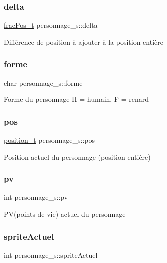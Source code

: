 \subsubsection{\texorpdfstring{delta}{delta}}
{\footnotesize\ttfamily \hyperlink{structfrac_pos__s}{frac\+Pos\+\_\+t} personnage\+\_\+s\+::delta}

Différence de position à ajouter à la position entière \mbox{\label{structpersonnage__s_a1f1eb200420640259201a84300bccf7e}} 
\subsubsection{\texorpdfstring{forme}{forme}}
{\footnotesize\ttfamily char personnage\+\_\+s\+::forme}

Forme du personnage H = humain, F = renard \mbox{\label{structpersonnage__s_adea4789f8b55587ec092f3a32b7b1964}} 
\subsubsection{\texorpdfstring{pos}{pos}}
{\footnotesize\ttfamily \hyperlink{structposition__s}{position\+\_\+t} personnage\+\_\+s\+::pos}

Position actuel du personnage (position entière) \mbox{\label{structpersonnage__s_ab3090d9110756af454516f939e9f8a86}} 
\subsubsection{\texorpdfstring{pv}{pv}}
{\footnotesize\ttfamily int personnage\+\_\+s\+::pv}

P\+V(points de vie) actuel du personnage \mbox{\label{structpersonnage__s_aec4def382ab17941f0edfe1c40f0cc59}} 
\subsubsection{\texorpdfstring{sprite\+Actuel}{spriteActuel}}
{\footnotesize\ttfamily int personnage\+\_\+s\+::sprite\+Actuel}

